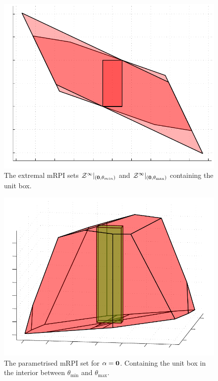 \documentclass[letterpaper, 10pt, conference]{ieeeconf} %
\begin{document}
\begin{figure}
\includegraphics[width=\columnwidth]{twoDimensional}
\caption{The extremal mRPI sets $\mathcal Z^\infty\vert_{({\bf{0}},\theta_{min})}$ and $\mathcal Z^\infty
\vert_{({\bf{0}},\theta_{\max})}$ containing the unit box.}
\label{fig:two:dim:example}
\end{figure}
\begin{figure}
\includegraphics[width=\columnwidth]{threeDimensional}
\caption{The parametrised mRPI set for $\alpha={\bf{0}}$. Containing the unit box in the 
interior between $\theta_{\min}$ and $\theta_{\max}$.}
\label{fig:three:dim:example}
\end{figure}
%
%
%
\end{document}
